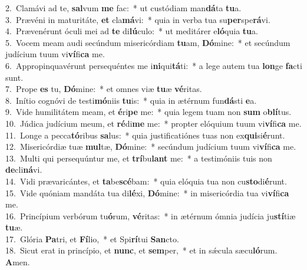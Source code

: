 {2.~}Clamávi ad te, \textbf{sal}vum \textbf{me} fac:~* ut custódiam man\textbf{dá}ta \textbf{tu}a.\\
{3.~}Prævéni in maturitáte, \textbf{et} cla\textbf{má}vi:~* quia in verba tua su\textbf{per}spe\textbf{rá}vi.\\
{4.~}Prævenérunt óculi mei ad \textbf{te} di\textbf{lú}culo:~* ut meditárer e\textbf{ló}quia \textbf{tu}a.\\
{5.~}Vocem meam audi secúndum misericórdiam \textbf{tu}am, \textbf{Dó}mine:~* et secúndum judícium tuum vi\textbf{ví}fi\textbf{ca} me.\\
{6.~}Appropinquavérunt persequéntes me i\textbf{ni}qui\textbf{tá}ti:~* a lege autem tua \textbf{lon}ge \textbf{fa}cti sunt.\\
{7.~}Prope \textbf{es} tu, \textbf{Dó}mine:~* et omnes viæ \textbf{tu}æ \textbf{vé}ritas.\\
{8.~}Inítio cognóvi de testi\textbf{mó}niis \textbf{tu}is:~* quia in ætérnum fun\textbf{dá}sti \textbf{e}a.\\
{9.~}Vide humilitátem meam, et \textbf{é}ri\textbf{pe} me:~* quia legem tuam non \textbf{sum} o\textbf{blí}tus.\\
{10.~}Júdica judícium meum, et \textbf{ré}di\textbf{me} me:~* propter elóquium tuum vi\textbf{ví}fi\textbf{ca} me.\\
{11.~}Longe a pecca\textbf{tó}ribus \textbf{sa}lus:~* quia justificatiónes tuas non ex\textbf{qui}si\textbf{é}runt.\\
{12.~}Misericórdiæ tuæ \textbf{mul}tæ, \textbf{Dó}mine:~* secúndum judícium tuum vi\textbf{ví}fi\textbf{ca} me.\\
{13.~}Multi qui persequúntur me, et \textbf{trí}bu\textbf{lant} me:~* a testimóniis tuis non \textbf{de}cli\textbf{ná}vi.\\
{14.~}Vidi prævaricántes, et \textbf{ta}be\textbf{scé}bam:~* quia elóquia tua non cu\textbf{sto}di\textbf{é}runt.\\
{15.~}Vide quóniam mandáta tua di\textbf{lé}xi, \textbf{Dó}mine:~* in misericórdia tua vi\textbf{ví}fi\textbf{ca} me.\\
{16.~}Princípium verbórum tu\textbf{ó}rum, \textbf{vé}ritas:~* in ætérnum ómnia judícia ju\textbf{stí}tiæ \textbf{tu}æ.\\
{17.~}Glória \textbf{Pa}tri, et \textbf{Fí}lio,~* et Spi\textbf{rí}tui \textbf{San}cto.\\
{18.~}Sicut erat in princípio, et \textbf{nunc}, et \textbf{sem}per,~* et in sǽcula sæcu\textbf{ló}rum. \textbf{A}men.\\
